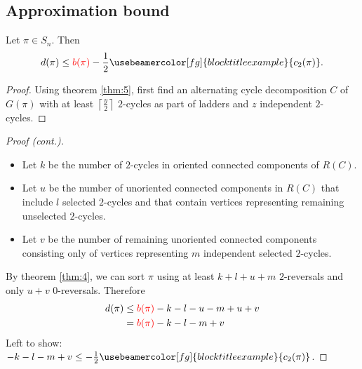 \documentclass{beamer}
\theoremstyle{definition}
\def\r{\textcolor{red}}
\def\g#1{{\usebeamercolor[fg]{block title example}{#1}}}
\begin{document}
\subsection{Approximation bound}

\begin{frame}

\begin{theorem}
\label{thm:6}
Let $\pi \in S_n$. Then
\begin{align*}
    d(\pi) \leq \r{b(\pi)} - \frac{1}{2} \g{c_2(\pi)}.
\end{align*}
\end{theorem}\pause

\begin{proof}\renewcommand{\qedsymbol}{}
Using theorem \ref{thm:5}, first find an alternating cycle decomposition $C$ of $G(\pi)$ with at least $\left\lceil \frac{y}{2} \right\rceil$ $2$-cycles as part of ladders and $z$ independent $2$-cycles.
\end{proof}

\end{frame}

\begin{frame}

\begin{proof}[Proof (cont.)]\renewcommand{\qedsymbol}{}
\begin{itemize}
    \item Let $k$ be the number of $2$-cycles in oriented connected components of $R(C)$.\pause
    \item Let $u$ be the number of unoriented connected components in $R(C)$ that include $l$ selected $2$-cycles and that contain vertices representing remaining unselected $2$-cycles.\pause
    \item Let $v$ be the number of remaining unoriented connected components consisting only of vertices representing $m$ independent selected $2$-cycles.
\end{itemize}\pause
By theorem \ref{thm:4}, we can sort $\pi$ using at least $k+l+u+m$ $2$-reversals and only $u+v$ $0$-reversals. \pause Therefore
\begin{align*}
    d(\pi) &\leq \r{b(\pi)} - k - l - u - m + u + v \\
           &= \r{b(\pi)} - k - l - m + v
\end{align*}\pause
Left to show: $-k-l-m+v \leq - \frac{1}{2} \g{c_2(\pi)}$.
\end{proof}

\end{frame}
\end{document}

